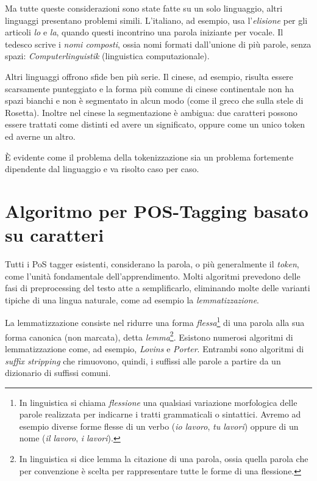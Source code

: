 Ma tutte queste considerazioni sono state fatte su un solo linguaggio, altri linguaggi presentano problemi simili.
L'italiano, ad esempio, usa l'\emph{elisione} per gli articoli \emph{lo} e \emph{la}, quando questi incontrino una parola iniziante per vocale.
Il tedesco scrive i \emph{nomi composti}, ossia nomi formati dall'unione di pi\`u parole, senza spazi: \emph{Computerlinguistik} (linguistica computazionale).

Altri linguaggi offrono sfide ben pi\`u serie.
Il cinese, ad esempio, risulta essere scarsamente punteggiato e la forma pi\`u comune di cinese continentale non ha spazi bianchi e non \`e segmentato in alcun modo (come il greco che sulla stele di Rosetta).
Inoltre nel cinese la segmentazione \`e ambigua: due caratteri possono essere trattati come distinti ed avere un significato, oppure come un unico token ed averne un altro.

\`E evidente come il problema della tokenizzazione sia un problema fortemente dipendente dal linguaggio e va risolto caso per caso.

\section{Algoritmo per POS-Tagging basato su caratteri}

Tutti i PoS tagger esistenti, considerano la parola, o pi\`u generalmente il \emph{token}, come l'unit\`a fondamentale dell'apprendimento.
Molti algoritmi prevedono delle fasi di preprocessing del testo atte a semplificarlo, eliminando molte delle varianti tipiche di una lingua naturale, come ad esempio la \emph{lemmatizzazione}.

La lemmatizzazione consiste nel ridurre una forma \emph{flessa}\footnote{In linguistica si chiama \emph{flessione} una qualsiasi variazione morfologica delle parole realizzata per indicarne i tratti grammaticali o sintattici. Avremo ad esempio diverse forme flesse di un verbo (\emph{io lavoro}, \emph{tu lavori}) oppure di un nome (\emph{il lavoro}, \emph{i lavori}).} di una parola alla sua forma canonica (non marcata), detta \emph{lemma}\footnote{In linguistica si dice lemma la citazione di una parola, ossia quella parola che per convenzione è scelta per rappresentare tutte le forme di una flessione.}.
Esistono numerosi algoritmi di lemmatizzazione come, ad esempio, \emph{Lovins} e \emph{Porter}.
Entrambi sono algoritmi di \emph{suffix stripping} che rimuovono, quindi, i suffissi alle parole a partire da un dizionario di suffissi comuni.

